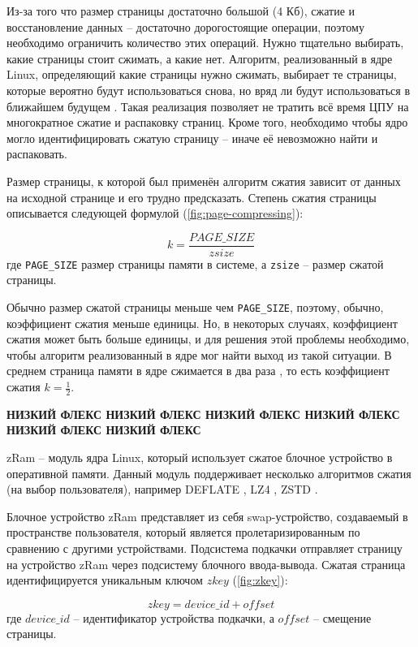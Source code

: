 Из-за того что размер страницы достаточно большой (4 Кб), сжатие и восстановление данных -- достаточно дорогостоящие операции, поэтому необходимо ограничить количество этих операций. Нужно тщательно выбирать, какие страницы стоит сжимать, а какие нет. Алгоритм, реализованный в ядре Linux, определяющий какие страницы нужно сжимать, выбирает те страницы, которые вероятно будут использоваться снова, но вряд ли будут использоваться в ближайшем будущем \cite{in-kernel-memory-compression}. Такая реализация позволяет не тратить всё время ЦПУ на многократное сжатие и распаковку страниц. Кроме того, необходимо чтобы ядро могло идентифицировать сжатую страницу -- иначе её невозможно найти и распаковать.

Размер страницы, к которой был применён алгоритм сжатия зависит от данных на исходной странице и его трудно предсказать. Степень сжатия страницы описывается следующей формулой (\ref{fig:page-compressing}):

\begin{equation}\label{fig:page-compressing}
	k = \frac{PAGE\_SIZE}{zsize}
\end{equation}
где \texttt{PAGE\_SIZE} размер страницы памяти в системе, а \texttt{zsize} -- размер сжатой страницы. 

Обычно размер сжатой страницы меньше чем \texttt{PAGE\_SIZE}, поэтому, обычно, коэффициент сжатия меньше единицы. Но, в некоторых случаях, коэффициент сжатия может быть больше единицы, и для решения этой проблемы необходимо, чтобы алгоритм реализованный в ядре мог найти выход из такой ситуации. В среднем страница памяти в ядре сжимается в два раза \cite{in-kernel-memory-compression}, то есть коэффициент сжатия $ k =\frac{1}{2}$.

\textbf{НИЗКИЙ ФЛЕКС НИЗКИЙ ФЛЕКС НИЗКИЙ ФЛЕКС НИЗКИЙ ФЛЕКС НИЗКИЙ ФЛЕКС НИЗКИЙ ФЛЕКС}

zRam \cite{zram} -- модуль ядра Linux, который использует сжатое блочное устройство в оперативной памяти. Данный модуль поддерживает несколько алгоритмов сжатия (на выбор пользователя), например DEFLATE \cite{deflate}, LZ4 \cite{lz4}, ZSTD \cite{zstd}. 

Блочное устройство zRam представляет из себя swap-устройство, создаваемый в пространстве пользователя, который является пролетаризированным по сравнению с другими устройствами. Подсистема подкачки отправляет страницу на устройство zRam через подсистему блочного ввода-вывода. Сжатая страница идентифицируется уникальным ключом $zkey$ (\ref{fig:zkey}):

\begin{equation}\label{fig:zkey}
	zkey = device\_id + offset
\end{equation}
где $device\_id$ -- идентификатор устройства подкачки, а $offset$ -- смещение страницы.

